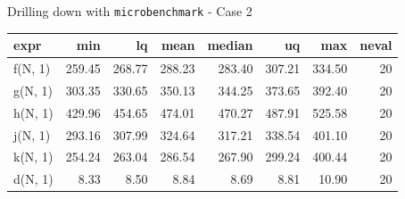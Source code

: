 \begin{frame}[fragile]{Drilling down with \texttt{microbenchmark} - Case
2}

\begin{Shaded}
\begin{Highlighting}[]
\StringTok{ } 
\StringTok{ }\NormalTok{(}\NormalTok{), }\NormalTok{), }\NormalTok{), }
                     \NormalTok{), }\NormalTok{), }\NormalTok{),}
                      \NormalTok{)   }
\end{Highlighting}
\end{Shaded}

\begin{Shaded}
\begin{Highlighting}[]
\end{Highlighting}
\end{Shaded}

\begin{longtable}[c]{@{}lrrrrrrr@{}}
\toprule
expr & min & lq & mean & median & uq & max & neval\tabularnewline
\midrule
\endhead
f(N, 1) & 259.45 & 268.77 & 288.23 & 283.40 & 307.21 & 334.50 &
20\tabularnewline
g(N, 1) & 303.35 & 330.65 & 350.13 & 344.25 & 373.65 & 392.40 &
20\tabularnewline
h(N, 1) & 429.96 & 454.65 & 474.01 & 470.27 & 487.91 & 525.58 &
20\tabularnewline
j(N, 1) & 293.16 & 307.99 & 324.64 & 317.21 & 338.54 & 401.10 &
20\tabularnewline
k(N, 1) & 254.24 & 263.04 & 286.54 & 267.90 & 299.24 & 400.44 &
20\tabularnewline
d(N, 1) & 8.33 & 8.50 & 8.84 & 8.69 & 8.81 & 10.90 & 20\tabularnewline
\bottomrule
\end{longtable}

\end{frame}

